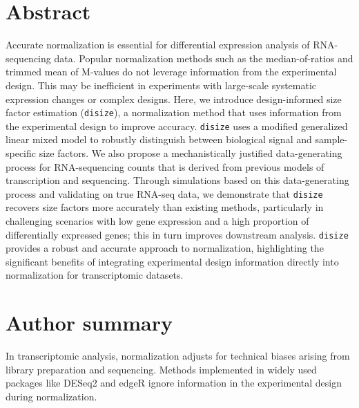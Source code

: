 \documentclass[10pt,letterpaper]{article}
\begin{document}
%
\section*{Abstract}
Accurate normalization is essential for differential expression analysis of RNA-sequencing data. 
Popular normalization methods such as the median-of-ratios and trimmed mean of M-values do not leverage information from the experimental design. 
This may be inefficient in experiments with large-scale systematic expression changes or complex designs.
Here, we introduce design-informed size factor estimation (\texttt{disize}), a normalization method that uses information from the experimental design to improve accuracy. 
\texttt{disize} uses a modified generalized linear mixed model to robustly distinguish between biological signal and sample-specific size factors. 
We also propose a mechanistically justified data-generating process for RNA-sequencing counts that is derived from previous models of transcription and sequencing. 
Through simulations based on this data-generating process and validating on true RNA-seq data, we demonstrate that \texttt{disize} recovers size factors more accurately than existing methods, particularly in challenging scenarios with low gene expression and a high proportion of differentially expressed genes; this in turn improves downstream analysis. 
\texttt{disize} provides a robust and accurate approach to normalization, highlighting the significant benefits of integrating experimental design information directly into normalization for transcriptomic datasets.

%
\section*{Author summary}
In transcriptomic analysis, normalization adjusts for technical biases arising from library preparation and sequencing. 
Methods implemented in widely used packages like DESeq2 and edgeR ignore information in the experimental design during normalization.
\end{document}
